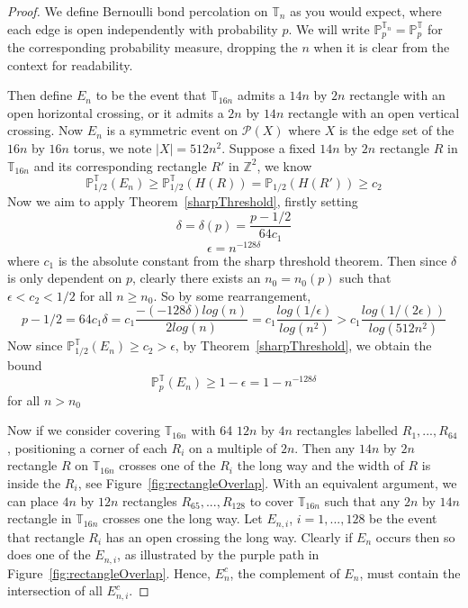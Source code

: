 \documentclass[a4paper,11pt]{article}
\theoremstyle{definition}
\newcommand{\ints}{\mathbb{Z}}
\newcommand{\prbhlf}{\mathbb{P}_{1/2}}
\newcommand{\probtorus}{\mathbb{P}^{\mathbb{T}}_{p}}
\newcommand{\probtorush}{\mathbb{P}^{\mathbb{T}}_{1/2}}
\begin{document}
\begin{proof}
	We define Bernoulli bond percolation on $\mathbb{T}_n$ as you would expect, where each edge is open independently with probability $p$. We will write $\mathbb{P}^{\mathbb{T}_n}_{p} = \probtorus$ for the corresponding probability measure, dropping the $n$ when it is clear from the context for readability.
	
	Then define $E_n$ to be the event that $\mathbb{T}_{16n}$ admits a $14n$ by $2n$ rectangle with an open horizontal crossing, or it admits a $2n$ by $14n$ rectangle with an open vertical crossing. Now $E_n$ is a symmetric event on $\mathcal{P}(X)$ where $X$ is the edge set of the $16n$ by $16n$ torus, we note $|X| = 512n^2$. Suppose a fixed $14n$ by $2n$ rectangle $R$ in $\mathbb{T}_{16n}$ and its corresponding rectangle $R'$ in $\ints^2$, we know 
	$$\probtorush(E_n) \geq \probtorush(H(R)) = \prbhlf(H(R')) \geq c_2$$
	Now we aim to apply Theorem~\ref{sharpThreshold}, firstly setting $$\delta = \delta(p) = \frac{p-1/2}{64 c_1}$$
	$$\epsilon = n^{-128 \delta}$$
	where $c_1$ is the absolute constant from the sharp threshold theorem. Then since $\delta$ is only dependent on $p$, clearly there exists an $n_0 = n_0(p)$ such that $\epsilon < c_2< 1/2$ for all $n \geq n_0$. 
	So by some rearrangement, 
	$$p-1/2 = 64 c_1 \delta = c_1\frac{-(-128 \delta)log(n)}{2log(n)} = c_1\frac{log(1/\epsilon)}{log(n^2)} > c_1\frac{log(1/(2\epsilon))}{log(512n^2)}$$  
	Now since $\probtorush(E_n) \geq c_2 > \epsilon$, by Theorem~\ref*{sharpThreshold}, we obtain the bound
	$$\probtorus(E_n) \geq 1-\epsilon = 1-n^{-128 \delta}$$
	for all $n>n_0$

	Now if we consider covering $\mathbb{T}_{16n}$ with 64 $12n$ by $4n$ rectangles labelled $R_1,...,R_{64}$, positioning a corner of each $R_i$ on a multiple of $2n$. Then any $14n$ by $2n$ rectangle $R$ on $\mathbb{T}_{16n}$ crosses one of the $R_i$ the long way and the width of $R$ is inside the $R_i$, see Figure~\ref*{fig:rectangleOverlap}. With an equivalent argument, we can place $4n$ by $12n$ rectangles $R_{65},...,R_{128}$ to cover $\mathbb{T}_{16n}$ such that any $2n$ by $14n$ rectangle in $\mathbb{T}_{16n}$ crosses one the long way. Let $E_{n,i}$, $i = 1,...,128$ be the event that rectangle $R_i$ has an open crossing the long way. Clearly if $E_n$ occurs then so does one of the $E_{n,i}$, as illustrated by the purple path in Figure~\ref*{fig:rectangleOverlap}. Hence, $E^c_n$, the complement of $E_n$, must contain the intersection of all $E^c_{n,i}$.


\end{proof}
\end{document}
